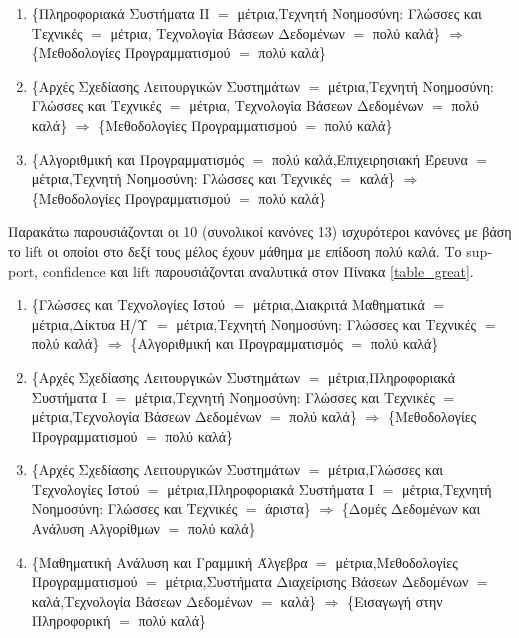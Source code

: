 \documentclass[12pt,a4paper,final]{article}
\begin{document}
\begin{landscape}
\begin{enumerate}
    \item \{Πληροφοριακά Συστήματα ΙΙ $=$ μέτρια,Τεχνητή Νοημοσύνη: Γλώσσες και Τεχνικές $=$ μέτρια,  Τεχνολογία Βάσεων Δεδομένων $=$ πολύ καλά\} $\Rightarrow$ \{Μεθοδολογίες Προγραμματισμού $=$ πολύ καλά\}

 
    \item \{Αρχές Σχεδίασης Λειτουργικών Συστημάτων $=$ μέτρια,Τεχνητή Νοημοσύνη: Γλώσσες και Τεχνικές $=$ μέτρια,  Τεχνολογία Βάσεων Δεδομένων $=$ πολύ καλά\} $\Rightarrow$  \{Μεθοδολογίες Προγραμματισμού $=$ πολύ καλά\}

    \item \{Αλγοριθμική και Προγραμματισμός $=$ πολύ καλά,Επιχειρησιακή Έρευνα $=$ μέτρια,Τεχνητή Νοημοσύνη: Γλώσσες και Τεχνικές $=$ καλά\} $\Rightarrow$ \{Μεθοδολογίες Προγραμματισμού $=$ πολύ καλά\}
\end{enumerate}
  
  
Παρακάτω παρουσιάζονται οι 10 (συνολικοί κανόνες 13) ισχυρότεροι κανόνες με βάση το \foreignlanguage{english}{lift} οι οποίοι στο δεξί τους μέλος έχουν μάθημα με επίδοση πολύ καλά. Το \foreignlanguage{english}{support, confidence} και \foreignlanguage{english}{lift} παρουσιάζονται αναλυτικά στον Πίνακα \ref{table_great}.
\begin{enumerate}

\item \{Γλώσσες και Τεχνολογίες Ιστού $=$ μέτρια,Διακριτά Μαθηματικά $=$ μέτρια,Δίκτυα Η/Υ $=$ μέτρια,Τεχνητή Νοημοσύνη: Γλώσσες και Τεχνικές $=$ πολύ καλά\} $\Rightarrow$ \{Αλγοριθμική και Προγραμματισμός $=$ πολύ καλά\}


\item \{Αρχές Σχεδίασης Λειτουργικών Συστημάτων $=$ μέτρια,Πληροφοριακά Συστήματα Ι $=$ μέτρια,Τεχνητή Νοημοσύνη: Γλώσσες και Τεχνικές $=$ μέτρια,Τεχνολογία Βάσεων Δεδομένων $=$ πολύ καλά\} $\Rightarrow$ \{Μεθοδολογίες Προγραμματισμού $=$ πολύ καλά\}


\item \{Αρχές Σχεδίασης Λειτουργικών Συστημάτων $=$ μέτρια,Γλώσσες και Τεχνολογίες Ιστού $=$ μέτρια,Πληροφοριακά Συστήματα Ι $=$ μέτρια,Τεχνητή Νοημοσύνη: Γλώσσες και Τεχνικές $=$ άριστα\} $\Rightarrow$ \{Δομές Δεδομένων και Ανάλυση Αλγορίθμων $=$ πολύ καλά\}


\item \{Μαθηματική Ανάλυση και Γραμμική Άλγεβρα $=$ μέτρια,Μεθοδολογίες Προγραμματισμού $=$ μέτρια,Συστήματα Διαχείρισης Βάσεων Δεδομένων $=$ καλά,Τεχνολογία Βάσεων Δεδομένων $=$ καλά\} $\Rightarrow$ \{Εισαγωγή στην Πληροφορική  $=$ πολύ καλά\}


\end{enumerate}
\end{landscape}
\end{document}
